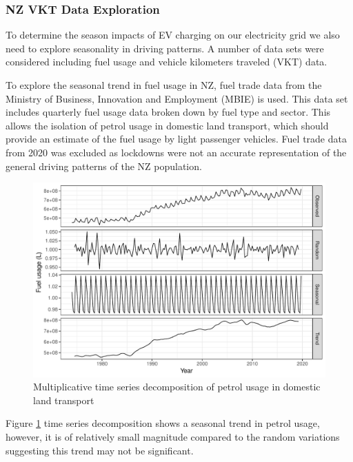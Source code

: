 \documentclass[
]{article}
\begin{document}
\hypertarget{nz-vkt-data-exploration}{%
\subsubsection{NZ VKT Data Exploration}\label{nz-vkt-data-exploration}}

To determine the season impacts of EV charging on our electricity grid
we also need to explore seasonality in driving patterns. A number of
data sets were considered including fuel usage and vehicle kilometers
traveled (VKT) data.

To explore the seasonal trend in fuel usage in NZ, fuel trade data
\cite{fuel_trade} from the Ministry of Business, Innovation and
Employment (MBIE) is used. This data set includes quarterly fuel usage
data broken down by fuel type and sector. This allows the isolation of
petrol usage in domestic land transport, which should provide an
estimate of the fuel usage by light passenger vehicles. Fuel trade data
from 2020 was excluded as lockdowns were not an accurate representation
of the general driving patterns of the NZ population.

\begin{figure}
\centering
\includegraphics{mixed_model_files/figure-latex/petrol_ts-1.pdf}
\caption{Multiplicative time series decomposition of petrol usage in
domestic land transport\label{fig:petrol_ts}}
\end{figure}

Figure \ref{fig:petrol_ts} time series decomposition shows a seasonal
trend in petrol usage, however, it is of relatively small magnitude
compared to the random variations suggesting this trend may not be
significant.
\end{document}
